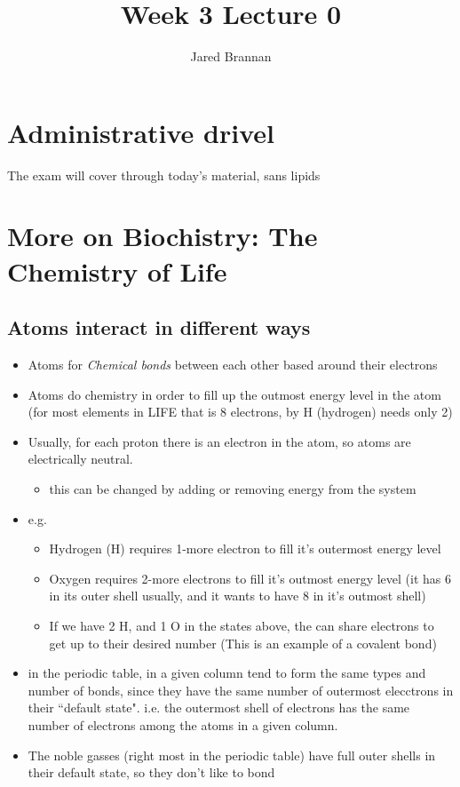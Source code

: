 \documentclass{article}
\title{Week 3 Lecture 0}
\author{Jared Brannan }
\theoremstyle{definition}
\begin{document}
\maketitle

\section{Administrative drivel}
The exam will cover through today's material, sans lipids

\section{More on Biochistry: The Chemistry of Life}
\subsection{Atoms interact in different ways}
\begin{itemize}
	\item Atoms for \textit{Chemical bonds}  between each other based around their electrons
	\item Atoms do chemistry in order to fill up the outmost energy level in the atom (for most elements in LIFE that is 8 electrons, by H (hydrogen) needs only 2)
	\item Usually, for each proton there is an electron in the atom, so atoms are electrically neutral.
		\begin{itemize}
			\item this can be changed by adding or removing energy from the system
		\end{itemize}
	\item e.g.
		\begin{itemize}
			\item Hydrogen (H) requires 1-more electron to fill it's outermost energy level
			\item Oxygen requires 2-more electrons to fill it's outmost energy level (it has 6 in its outer shell usually, and it wants to have 8 in it's outmost shell)
			\item If we have 2 H, and 1 O in the states above, the can share electrons to get up to their desired number (This is an example of a covalent bond)
		\end{itemize}
	\item in the periodic table, in a given column tend to form the same types and number of bonds, since they have the same number of outermost elecctrons in their ``default state". i.e. the outermost shell of electrons has the same number of electrons among the atoms in a given column.
	\item The noble gasses (right most in the periodic table) have full outer shells in their default state, so they don't like to bond
\end{itemize}
\end{document}
